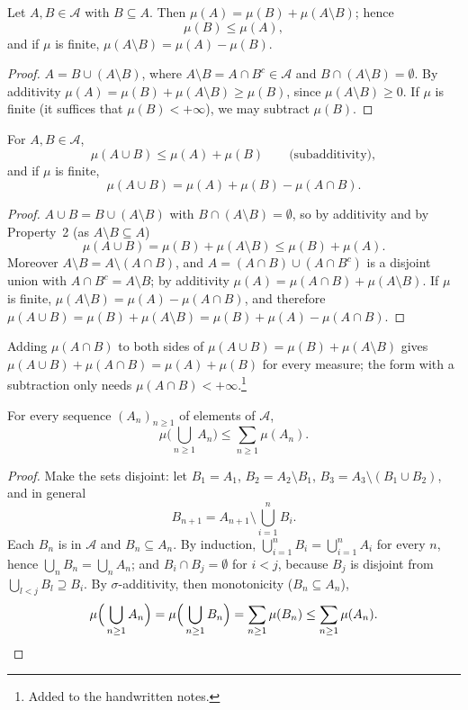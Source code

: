 \begin{proposition}\label{prop:ms-monotone}
Let $A,B\in\mathcal A$ with $B\subseteq A$. Then $\mu(A)=\mu(B)+\mu(A\setminus B)$; hence
\[
  \mu(B)\le\mu(A),
\]
and if $\mu$ is finite, $\mu(A\setminus B)=\mu(A)-\mu(B)$.
\end{proposition}

\begin{proof}
$A=B\cup(A\setminus B)$, where $A\setminus B=A\cap B^c\in\mathcal A$ and
$B\cap(A\setminus B)=\emptyset$. By additivity $\mu(A)=\mu(B)+\mu(A\setminus B)\ge\mu(B)$,
since $\mu(A\setminus B)\ge0$. If $\mu$ is finite (it suffices that $\mu(B)<+\infty$), we may
subtract $\mu(B)$.
\end{proof}

\begin{proposition}\label{prop:ms-union}
For $A,B\in\mathcal A$,
\[
  \mu(A\cup B)\le\mu(A)+\mu(B)\qquad\text{(subadditivity)},
\]
and if $\mu$ is finite,
\[
  \mu(A\cup B)=\mu(A)+\mu(B)-\mu(A\cap B).
\]
\end{proposition}

\begin{proof}
$A\cup B=B\cup(A\setminus B)$ with $B\cap(A\setminus B)=\emptyset$, so by additivity and by
Property~2 (as $A\setminus B\subseteq A$)
\[
  \mu(A\cup B)=\mu(B)+\mu(A\setminus B)\le\mu(B)+\mu(A).
\]
Moreover $A\setminus B=A\setminus(A\cap B)$, and $A=(A\cap B)\cup(A\cap B^c)$ is a disjoint
union with $A\cap B^c=A\setminus B$; by additivity $\mu(A)=\mu(A\cap B)+\mu(A\setminus B)$. If
$\mu$ is finite, $\mu(A\setminus B)=\mu(A)-\mu(A\cap B)$, and therefore
$\mu(A\cup B)=\mu(B)+\mu(A\setminus B)=\mu(B)+\mu(A)-\mu(A\cap B)$.
\end{proof}

Adding $\mu(A\cap B)$ to both sides of $\mu(A\cup B)=\mu(B)+\mu(A\setminus B)$ gives
$\mu(A\cup B)+\mu(A\cap B)=\mu(A)+\mu(B)$ for every measure; the form with a subtraction only
needs $\mu(A\cap B)<+\infty$.\footnote{Added to the handwritten notes.}

\begin{proposition}\label{prop:ms-subadditive}
For every sequence $(A_n)_{n\ge1}$ of elements of $\mathcal A$,
\[
  \mu\Big(\bigcup_{n\ge1}A_n\Big)\le\sum_{n\ge1}\mu(A_n).
\]
\end{proposition}

\begin{proof}
Make the sets disjoint: let $B_1=A_1$, $B_2=A_2\setminus B_1$, $B_3=A_3\setminus(B_1\cup B_2)$,
and in general
\[
  B_{n+1}=A_{n+1}\setminus\bigcup_{i=1}^nB_i .
\]
Each $B_n$ is in $\mathcal A$ and $B_n\subseteq A_n$. By induction,
$\bigcup_{i=1}^nB_i=\bigcup_{i=1}^nA_i$ for every $n$, hence $\bigcup_nB_n=\bigcup_nA_n$; and
$B_i\cap B_j=\emptyset$ for $i<j$, because $B_j$ is disjoint from $\bigcup_{l<j}B_l\supseteq B_i$.
By $\sigma$-additivity, then monotonicity ($B_n\subseteq A_n$),
\[
  \mu\Big(\bigcup_{n\ge1}A_n\Big)=\mu\Big(\bigcup_{n\ge1}B_n\Big)=\sum_{n\ge1}\mu(B_n)
  \le\sum_{n\ge1}\mu(A_n). \qedhere
\]
\end{proof}

